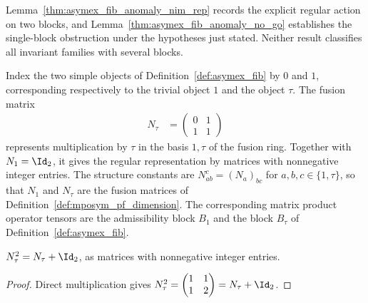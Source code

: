Lemma~\ref{thm:asymex_fib_anomaly_nim_rep} records the explicit regular
action on two blocks, and Lemma~\ref{thm:asymex_fib_anomaly_no_go}
establishes the single-block obstruction under the hypotheses just stated.
Neither result classifies all invariant families with several blocks.

\begin{definition}%
    \label{def:asymex_fib_anomaly_nim}
    \leanok
    Index the two simple objects of Definition~\ref{def:asymex_fib} by
    $0$ and $1$, corresponding respectively to the trivial object $1$
    and the object $\tau$. The fusion matrix
    \begin{align}
        N_\tau & =\begin{pmatrix}0&1\\1&1\end{pmatrix}
        \label{eq:asymex_fib_anomaly_matrix}
    \end{align}
    represents multiplication by $\tau$ in the basis $1,\tau$ of the
    fusion ring. Together with $N_1=\Id_2$, it gives the regular
    representation by matrices with nonnegative integer entries. The
    structure constants are $N_{ab}^c=(N_a)_{bc}$ for
    $a,b,c\in\{1,\tau\}$, so that $N_1$ and $N_\tau$ are the fusion
    matrices of Definition~\ref{def:mposym_pf_dimension}. The corresponding
    matrix product operator tensors are the admissibility block $B_1$ and
    the block $B_\tau$ of Definition~\ref{def:asymex_fib}.
\end{definition}

\begin{lemma}%
    \label{thm:asymex_fib_anomaly_matrix_sq}
    \leanok
    $N_\tau^2=N_\tau+\Id_2$, as matrices with nonnegative integer entries.
\end{lemma}

\begin{proof}
    \leanok
    Direct multiplication gives
    $N_\tau^2=\begin{pmatrix}1&1\\1&2\end{pmatrix}=N_\tau+\Id_2$.
\end{proof}


